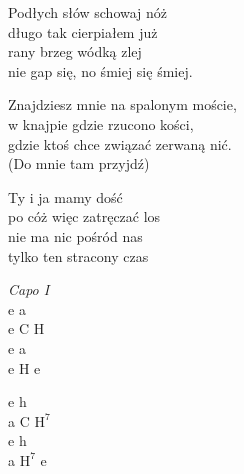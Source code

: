 \begin{text}
    \hfill\break
    Podłych słów schowaj nóż\\
    długo tak cierpiałem już\\
    rany brzeg wódką zlej\\
    nie gap się, no śmiej się śmiej.

    \vin Znajdziesz mnie na spalonym moście,\\
    \vin w knajpie gdzie rzucono kości,\\
    \vin gdzie ktoś chce związać zerwaną nić.\\
    \vin (Do mnie tam przyjdź)

    Ty i ja mamy dość\\
    po cóż więc zatręczać los\\
    nie ma nic pośród nas\\
    tylko ten stracony czas
\end{text}
\begin{chord}
    \textit{Capo I}\\
    e a\\
    e C H\\
    e a\\
    e H e

    e h\\
    a C $\mathrm{H^7}$\\
    e h\\
    a $\mathrm{H^7}$ e
\end{chord}
